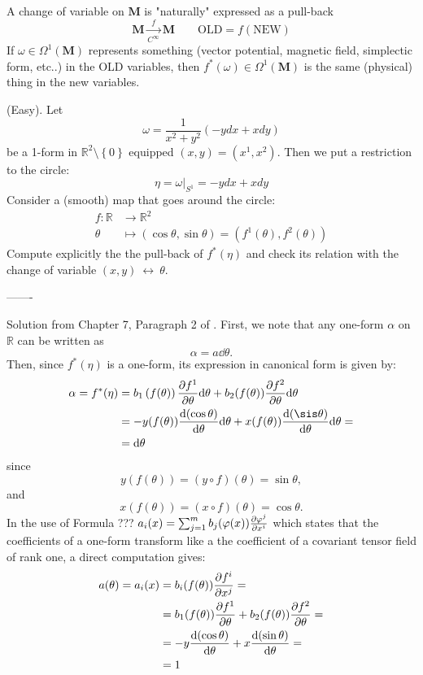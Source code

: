 \documentclass[../main.tex]{subfiles}
\begin{document}
{\selectfont{}\relax} A change of variable on $\mathbf{M}$ is "naturally" expressed as a pull-back
\[
\mathbf{M}\xrightarrow[C^\infty]{f}\mathbf{M} \qquad \textrm{OLD}=f(\textrm{NEW})
\]
If $\omega\in\Omega^1(\mathbf{M})$ represents something (vector potential, magnetic field, simplectic form, etc..) in the OLD variables, then $f^\ast(\omega)\in\Omega^1(\mathbf{M})$ is the same (physical) thing in the new variables.
\begin{exercise}
(Easy). Let 
\[
\omega = \frac{1}{x^2+y^2}\left(-ydx+xdy\right)
\]
be a 1-form in $\mathbb{R}^2 \setminus \left\{0\right\}$ equipped $(x,y)=(x^1,x^2)$. Then we put a restriction to the circle:
\[
\eta=\omega\Big|_{S^1}=-ydx+xdy
\]
Consider a (smooth) map that goes around the circle:
\[
\begin{split}
f:\mathbb{R}& \to \mathbb{R}^2\\
\theta &\mapsto \left(\cos\theta,\sin\theta\right)=\left(f^1(\theta),f^2(\theta)\right)
\end{split}
\]
Compute explicitly the the pull-back of $f^\ast(\eta)$ and check its relation with the change of variable $(x,y)\ \longleftrightarrow \ \theta$.

-------

Solution from Chapter 7, Paragraph 2 of . First, we note that any one-form $\alpha$ on $\mathbb{R}$ can be written as
\[
\alpha=a\dd\theta.
\]
Then, since $f^\ast(\eta)$ is a one-form, its expression in canonical form is given by:
\[
\begin{split}
\alpha=f^\ast(\eta)&=b_1\left(f(\theta)\right)\pdv{f^1}{\theta}\dd\theta+b_2(f(\theta))\pdv{f^2}{\theta}\dd\theta\\
&=-y(f(\theta))\dv{(\cos\theta)}{\theta}\dd\theta+x(f(\theta))\dv{(\sis\theta)}{\theta}\dd\theta=\\
&=\dd\theta
\end{split}
\]
since
\[
y(f(\theta))=(y\circ f)(\theta)=\sin\theta,
\]
and
\[
x(f(\theta))=(x\circ f)(\theta)=\cos\theta.
\]
In the use of Formula ??? $a_i(x)=\sum_{j=1}^mb_j(\varphi(x))\pdv{\varphi^j}{x^i}$ which states that the coefficients of a one-form transform like a the coefficient of a covariant tensor field of rank one, a direct computation gives:
\[
\begin{split}
a(\theta)=a_i(x)
&=b_i(f(\theta))\pdv{f^i}{x^j}=\\
&=b_1(f(\theta))\pdv{f^1}{\theta}+b_2(f(\theta))\pdv{f^2}{\theta}=\\
&=-y\dv{(\cos\theta)}{\theta}+x\dv{(\sin\theta)}{\theta}=\\
&=1
\end{split}
\]
\end{exercise}
\end{document}
